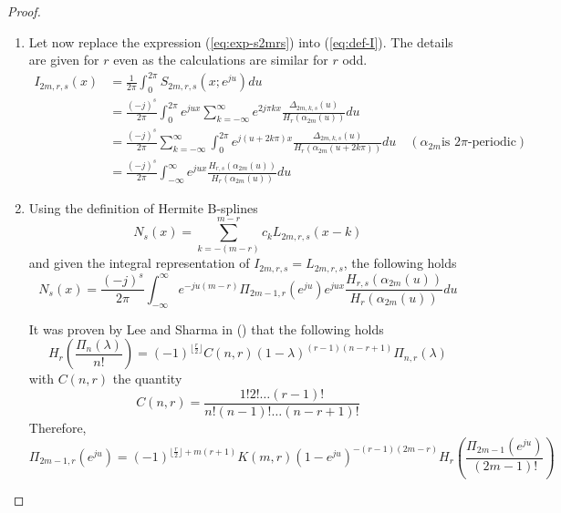 \begin{proof}
\begin{enumerate}
  \item Let now replace the expression (\ref{eq:exp-s2mrs}) into (\ref{eq:def-I}). The details are given for $r$ even as 
    the calculations are similar for $r$ odd.
    \begin{align*}
      I_{2m,r,s}(x) &= \frac{1}{2\pi} \int_0^{2\pi} S_{2m, r, s}(x;e^{ju}) du \\
      &= \frac{{(-j)}^s}{2\pi} \int_0^{2\pi} e^{jux} \sum_{k=-\infty}^{\infty}  e^{2j\pi kx} 
      \frac{\Delta_{2m,k,s}(u)}{H_r(\alpha_{2m}(u))} du \\
      &= \frac{{(-j)}^s}{2\pi} \sum_{k=-\infty}^{\infty} \int_0^{2\pi} e^{j(u+2k\pi) x}  
      \frac{\Delta_{2m,k,s}(u)}{H_r(\alpha_{2m}(u+2k\pi))} du \quad (\alpha_{2m} \text{is $2\pi$-periodic}) \\
      &= \frac{{(-j)}^s}{2\pi} \int_{-\infty}^{\infty} e^{jux} \frac{H_{r, s}(\alpha_{2m}(u))}{H_r(\alpha_{2m}(u))} du
    \end{align*}

    \item  Using the definition of Hermite B-splines
    \begin{equation*}
      N_s(x) = \sum_{k=-(m-r)}^{m-r} c_k L_{2m,r,s}(x-k)
    \end{equation*}
    and given the integral representation of $I_{2m,r,s} = L_{2m,r,s}$, the following holds
    \begin{equation}
      N_s(x) = \frac{{(-j)}^s}{2\pi} \int_{-\infty}^{\infty} e^{-ju(m-r)} \Pi_{2m-1,r}(e^{ju}) e^{jux} \frac{H_{r, 
      s}(\alpha_{2m}(u))}{H_r(\alpha_{2m}(u))} du
    \end{equation}

    It was proven by Lee and Sharma in (\cite[Theorem 4]{LeeSh76}) that the following holds
      \begin{equation}\label{eq:LeeSh}
	H_r\left(\frac{\Pi_{n}(\lambda)}{n!}\right) = {(-1)}^{\lfloor \frac{r}{2}\rfloor} C(n,r) 
	{(1-\lambda)}^{(r-1)(n-r+1)} \Pi_{n,r}(\lambda)
    \end{equation}
    with $C(n,r)$ the quantity
    \begin{equation*}
      C(n,r) = \frac{1!2!\ldots(r-1)!}{n!(n-1)!\ldots(n-r+1)!}
    \end{equation*}
    Therefore,
    \begin{equation*}
      \Pi_{2m-1,r}(e^{ju}) = {(-1)}^{\lfloor \frac{r}{2} \rfloor + m(r+1)} K(m,r) {(1-e^{ju})}^{-(r-1)(2m-r)} H_r\left( 
      \frac{\Pi_{2m-1}(e^{ju})}{(2m-1)!} \right)
    \end{equation*}
    

\end{enumerate}
\end{proof}
